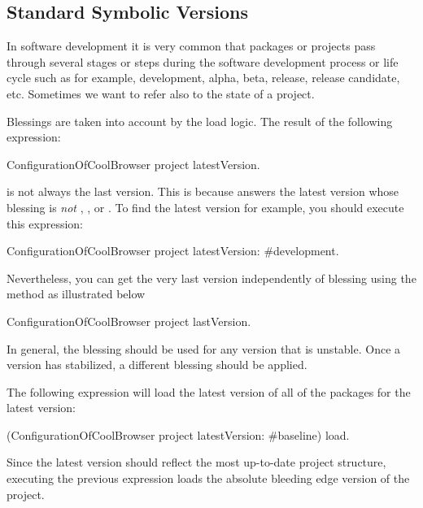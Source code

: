 \documentclass[a4paper,10pt,twoside]{book}
\begin{document}
   
\subsection{Standard Symbolic Versions}

In software development it is very common that packages or projects pass through several stages or steps during the software development process or life cycle such as for example, development, alpha, beta,  release, release candidate, etc. Sometimes we want to refer also to the state of a project.

Blessings are taken into account by the load logic. The result of the following expression:
\begin{code}{}
ConfigurationOfCoolBrowser project latestVersion.
\end{code}
is not always the last version.  This is because  answers the latest version whose blessing is {\em not} , , or . To find the latest  version for example, you should execute this expression:

\begin{code}{}
ConfigurationOfCoolBrowser project latestVersion: #development.
\end{code}

Nevertheless, you can get the very last version independently of blessing using the  method as illustrated below

\begin{code}{}
ConfigurationOfCoolBrowser project lastVersion.
\end{code}

In general, the  blessing should be used for any version that is unstable. Once a version has stabilized, a different blessing should be applied.

The following expression will load the latest version of all of the packages for the latest  version:
 \begin{code}{}
(ConfigurationOfCoolBrowser project latestVersion: #baseline) load.
\end{code}

Since the latest  version should reflect the most up-to-date project structure, executing the previous expression loads the absolute bleeding edge version of the project. 
\end{document}
